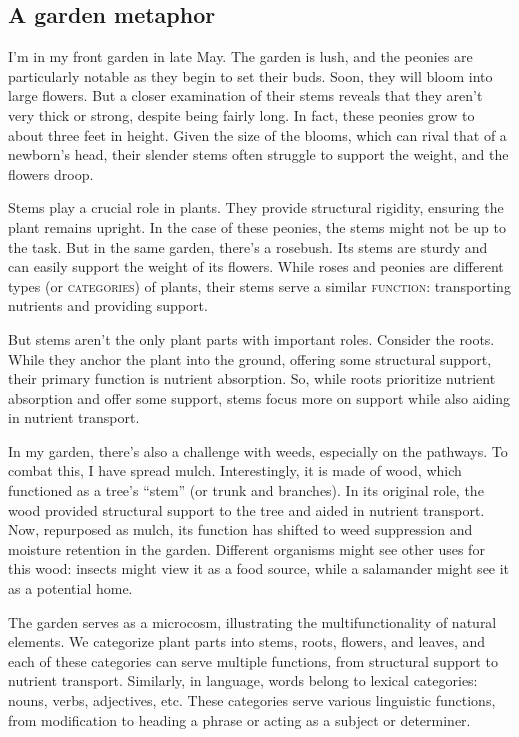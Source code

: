 \subsection*{A garden metaphor}

I'm in my front garden in late May. The garden is lush, and the peonies are particularly notable as they begin to set their buds. Soon, they will bloom into large flowers. But a closer examination of their stems reveals that they aren't very thick or strong, despite being fairly long. In fact, these peonies grow to about three feet in height. Given the size of the blooms, which can rival that of a newborn's head, their slender stems often struggle to support the weight, and the flowers droop.

Stems play a crucial role in plants. They provide structural rigidity, ensuring the plant remains upright. In the case of these peonies, the stems might not be up to the task. But in the same garden, there's a rosebush. Its stems are sturdy and can easily support the weight of its flowers. While roses and peonies are different types (or \textsc{categories}) of plants, their stems serve a similar \textsc{function}: transporting nutrients and providing support.

But stems aren't the only plant parts with important roles. Consider the roots. While they anchor the plant into the ground, offering some structural support, their primary function is nutrient absorption. So, while roots prioritize nutrient absorption and offer some support, stems focus more on support while also aiding in nutrient transport.

In my garden, there's also a challenge with weeds, especially on the pathways. To combat this, I have spread mulch. Interestingly, it is made of wood, which functioned as a tree's ``stem'' (or trunk and branches). In its original role, the wood provided structural support to the tree and aided in nutrient transport. Now, repurposed as mulch, its function has shifted to weed suppression and moisture retention in the garden. Different organisms might see other uses for this wood: insects might view it as a food source, while a salamander might see it as a potential home.

The garden serves as a microcosm, illustrating the multifunctionality of natural elements. We categorize plant parts into stems, roots, flowers, and leaves, and each of these categories can serve multiple functions, from structural support to nutrient transport. Similarly, in language, words belong to lexical categories: nouns, verbs, adjectives, etc. These categories serve various linguistic functions, from modification to heading a phrase or acting as a subject or determiner.

